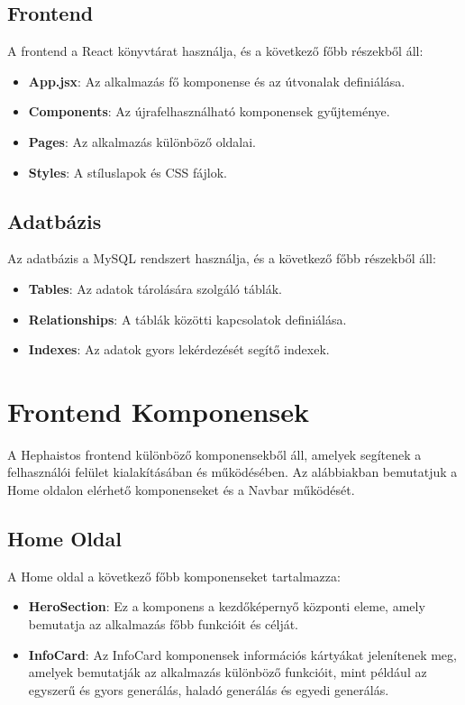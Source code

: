 \documentclass{article}
\begin{document}
\subsection{Frontend}
A frontend a React könyvtárat használja, és a következő főbb részekből áll:
\begin{itemize}
    \item \textbf{App.jsx}: Az alkalmazás fő komponense és az útvonalak definiálása.
    \item \textbf{Components}: Az újrafelhasználható komponensek gyűjteménye.
    \item \textbf{Pages}: Az alkalmazás különböző oldalai.
    \item \textbf{Styles}: A stíluslapok és CSS fájlok.
\end{itemize}

\subsection{Adatbázis}
Az adatbázis a MySQL rendszert használja, és a következő főbb részekből áll:
\begin{itemize}
    \item \textbf{Tables}: Az adatok tárolására szolgáló táblák.
    \item \textbf{Relationships}: A táblák közötti kapcsolatok definiálása.
    \item \textbf{Indexes}: Az adatok gyors lekérdezését segítő indexek.
\end{itemize}

\section{Frontend Komponensek}
A Hephaistos frontend különböző komponensekből áll, amelyek segítenek a felhasználói felület kialakításában és működésében. Az alábbiakban bemutatjuk a Home oldalon elérhető komponenseket és a Navbar működését.

\subsection{Home Oldal}
A Home oldal a következő főbb komponenseket tartalmazza:
\begin{itemize}
    \item \textbf{HeroSection}: Ez a komponens a kezdőképernyő központi eleme, amely bemutatja az alkalmazás főbb funkcióit és célját.
    \item \textbf{InfoCard}: Az InfoCard komponensek információs kártyákat jelenítenek meg, amelyek bemutatják az alkalmazás különböző funkcióit, mint például az egyszerű és gyors generálás, haladó generálás és egyedi generálás.
\end{itemize}
\end{document}
